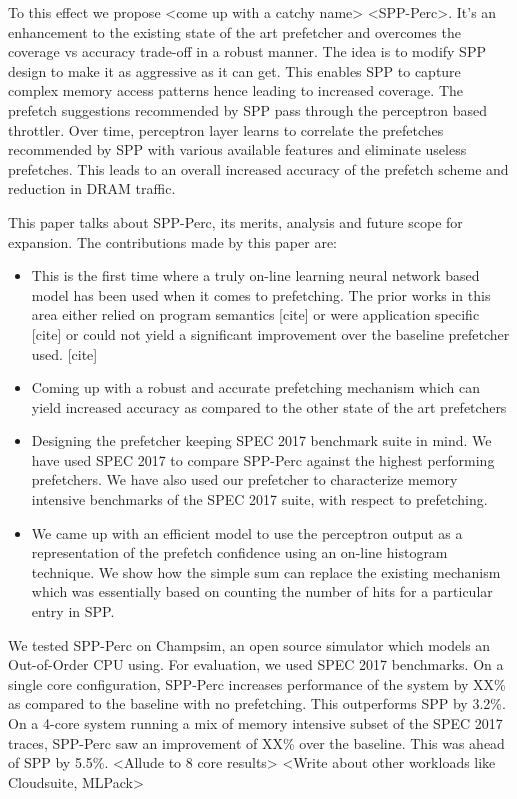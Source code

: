 \documentclass{sig-alternate}
\begin{document}
To this effect we propose <come up with a catchy name> <SPP-Perc>. 
It's an enhancement to the existing state of the art prefetcher and overcomes the coverage vs accuracy trade-off in a robust manner. 
The idea is to modify SPP design to make it as aggressive as it can get. 
This enables SPP to capture complex memory access patterns hence leading to increased coverage. 
The prefetch suggestions recommended by SPP pass through the perceptron based throttler. 
Over time, perceptron layer learns to correlate the prefetches recommended by SPP with various available features and eliminate useless prefetches. 
This leads to an overall increased accuracy of the prefetch scheme and reduction in DRAM traffic.

\vspace{1ex}This paper talks about SPP-Perc, its merits, analysis and future scope for expansion. 
The contributions made by this paper are:

\begin{itemize}
\item This is the first time where a truly on-line learning neural network based model has been used when it comes to prefetching. 
The prior works in this area either relied on program semantics [cite] or were application specific [cite] or could not yield a significant improvement over the baseline prefetcher used. [cite]

\item Coming up with a robust and accurate prefetching mechanism which can yield increased accuracy as compared to the other state of the art prefetchers

\item Designing the prefetcher keeping SPEC 2017 benchmark suite in mind. 
We have used SPEC 2017 to compare SPP-Perc against the highest performing prefetchers. 
We have also used our prefetcher to characterize memory intensive benchmarks of the SPEC 2017 suite, with respect to prefetching.

\item We came up with an efficient model to use the perceptron output as a representation of the prefetch confidence using an on-line histogram technique. 
We show how the simple sum can replace the existing mechanism which was essentially based on counting the number of hits for a particular entry in SPP.

\end{itemize}

We tested SPP-Perc on Champsim, an open source simulator which models an Out-of-Order CPU using. 
For evaluation, we used SPEC 2017 benchmarks. 
On a single core configuration, SPP-Perc increases performance of the system by XX\% as compared to the baseline with no prefetching. 
This outperforms SPP by 3.2\%. 
On a 4-core system running a mix of memory intensive subset of the SPEC 2017 traces, SPP-Perc saw an improvement of XX\% over the baseline. 
This was ahead of SPP by 5.5\%. 
<Allude to 8 core results>
<Write about other workloads like Cloudsuite, MLPack>
\end{document}
